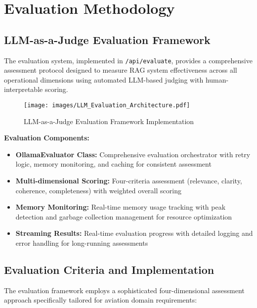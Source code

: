 \section{Evaluation Methodology}
\label{sec:evaluation_s3}

\subsection{LLM-as-a-Judge Evaluation Framework}
\label{subsec:evaluation_framework_s3}

The evaluation system, implemented in \texttt{/api/evaluate}, provides a comprehensive assessment protocol designed to measure RAG system effectiveness across all operational dimensions using automated LLM-based judging with human-interpretable scoring.

\begin{figure}[H]
\centering
\texttt{[image: images/LLM\_Evaluation\_Architecture.pdf]}
\caption{LLM-as-a-Judge Evaluation Framework Implementation}
\label{fig:llm_evaluation_framework_s3}
\end{figure}

\textbf{Evaluation Components:}
\begin{itemize}
    \item \textbf{OllamaEvaluator Class:} Comprehensive evaluation orchestrator with retry logic, memory monitoring, and caching for consistent assessment
    \item \textbf{Multi-dimensional Scoring:} Four-criteria assessment (relevance, clarity, coherence, completeness) with weighted overall scoring
    \item \textbf{Memory Monitoring:} Real-time memory usage tracking with peak detection and garbage collection management for resource optimization
    \item \textbf{Streaming Results:} Real-time evaluation progress with detailed logging and error handling for long-running assessments
\end{itemize}

\subsection{Evaluation Criteria and Implementation}
\label{subsec:evaluation_criteria_s3}

The evaluation framework employs a sophisticated four-dimensional assessment approach specifically tailored for aviation domain requirements:

